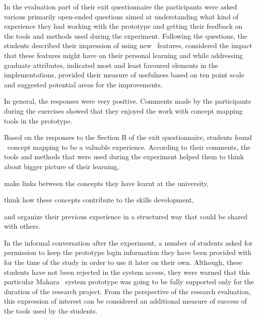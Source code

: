 In the evaluation part of their exit questionnaire the participants were asked
various primarily open-ended questions aimed at understanding what kind of
experience they had working with the prototype and getting their feedback on the
tools and methods used during the experiment. Following the questions, the
students described their impression of using new \ep~features, considered the
impact that these features might have on their personal learning and while
addressing graduate attributes, indicated most and least favoured elements in the
implementations, provided their measure of usefulness based on ten point scale
and suggested potential areas for the improvements.

In general, the responses were very positive. Comments made by the participants
during the exercises showed that they enjoyed the work with concept mapping
tools in the prototype. 

Based on the responses to the Section B of the exit questionnaire, students
found \ep~concept mapping to be a valuable experience. According to their
comments, the tools and methods that were used during the experiment helped
them to think about bigger picture of their learning, 


make links between the concepts they have learnt at the university, 

think how these concepts contribute to the skills development, 

and organize their previous experience in a structured way that could be shared
with others.

In the informal conversation after the experiment, a number of students asked
for permission to keep the prototype login information they have been provided
with for the time of the study in order to use it later on their own. Although,
these students have not been rejected in the system access, they were warned
that this particular Mahara \ep~system prototype was going to be fully supported
only for the duration of the research project. From the perspective of the
research evaluation, this expression of interest can be considered an additional
measure of success of the tools used by the students.

